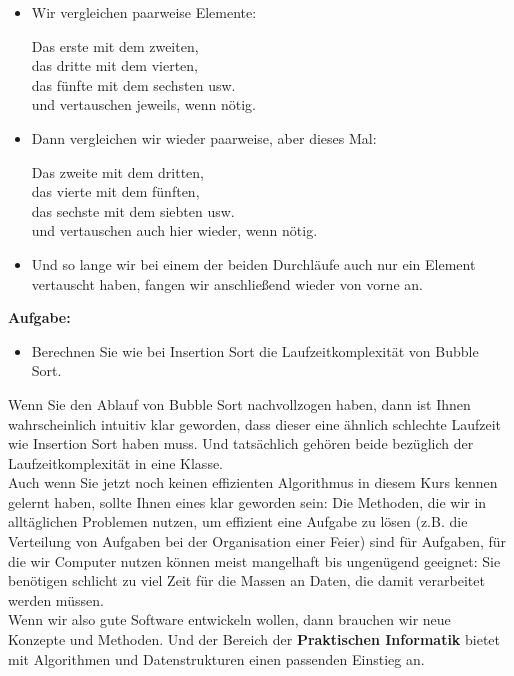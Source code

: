 \begin{itemize}
	\item Wir vergleichen paarweise Elemente:
	
	Das erste mit dem zweiten,\\
	das dritte mit dem vierten,\\
	das fünfte mit dem sechsten usw.\\
	und vertauschen jeweils, wenn nötig.
	
	\item Dann vergleichen wir wieder paarweise, aber dieses Mal:
	
	Das zweite mit dem dritten,\\
	das vierte mit dem fünften,\\
	das sechste mit dem siebten usw.\\
	und vertauschen auch hier wieder, wenn nötig.
	
	\item Und so lange wir bei einem der beiden Durchläufe auch nur ein Element vertauscht haben, fangen wir anschließend wieder von vorne an.
\end{itemize}

\textbf{Aufgabe:}

\begin{itemize}
	\item Berechnen Sie wie bei Insertion Sort die Laufzeitkomplexität von Bubble Sort.
\end{itemize}

Wenn Sie den Ablauf von Bubble Sort nachvollzogen haben, dann ist Ihnen wahrscheinlich intuitiv klar geworden, dass dieser eine ähnlich schlechte Laufzeit wie Insertion Sort haben muss. Und tatsächlich gehören beide bezüglich der Laufzeitkomplexität in eine Klasse.\\

Auch wenn Sie jetzt noch keinen effizienten Algorithmus in diesem Kurs kennen gelernt haben, sollte Ihnen eines klar geworden sein: Die Methoden, die wir in alltäglichen Problemen nutzen, um effizient eine Aufgabe zu lösen (z.B. die Verteilung von Aufgaben bei der Organisation einer Feier) sind für Aufgaben, für die wir Computer nutzen können meist mangelhaft bis ungenügend geeignet: Sie benötigen schlicht zu viel Zeit für die Massen an Daten, die damit verarbeitet werden müssen.\\

Wenn wir also gute Software entwickeln wollen, dann brauchen wir neue Konzepte und Methoden. Und der Bereich der \textbf{Praktischen Informatik} bietet mit \glqq{}Algorithmen und Datenstrukturen\grqq{} einen passenden Einstieg an.

